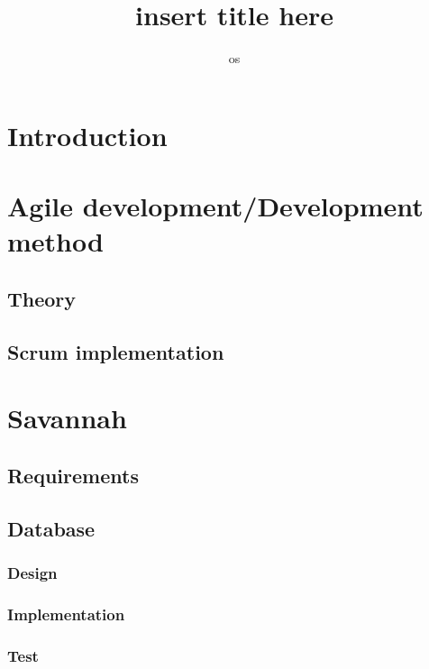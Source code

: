 

\title{insert title here} %
\author{os} %


\maketitle
\tableofcontents

	\chapter{Introduction}
	
		
\chapter{Agile development/Development method} %
 \section{Theory}
	
 \section{Scrum implementation}
	
 
\chapter{Savannah} %
  \section{Requirements} %
  \section{Database}
  	
    \subsection{Design}
    	
    \subsection{Implementation}
    	
    \subsection{Test}

